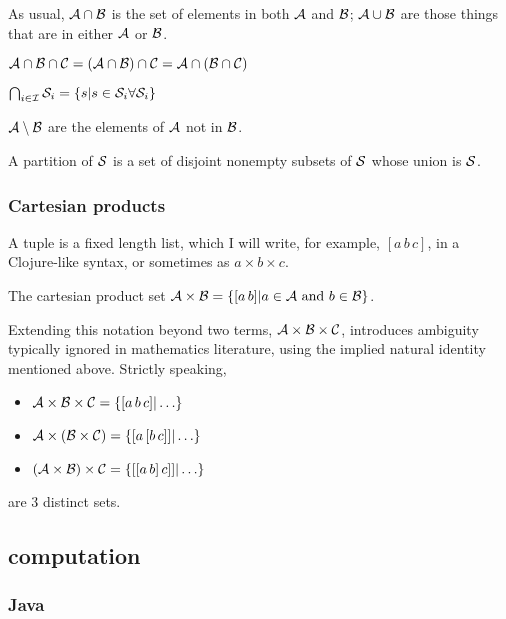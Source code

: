 As usual, $\mathcal{A} \cap \mathcal{B}$ is the set of elements in both 
$\mathcal{A}$ and $\mathcal{B}$; $\mathcal{A} \cup \mathcal{B}$ are those things
that are in either $\mathcal{A}$ or $\mathcal{B}$.

$\mathcal{A} \cap \mathcal{B} \cap \mathcal{C} 
= (\mathcal{A} \cap \mathcal{B}) \cap \mathcal{C} 
= \mathcal{A} \cap (\mathcal{B} \cap \mathcal{C}) $

$\bigcap_{i \in \mathcal{I}} \mathcal{S}_{i} = \{ s | s \in \mathcal{S}_{i}
\forall \mathcal{S}_{i} \}$

$\mathcal{A} \setminus \mathcal{B}$ are the elements of $\mathcal{A}$ 
not in $\mathcal{B}$.

A partition of $\mathcal{S}$ is a set of disjoint nonempty subsets of
$\mathcal{S}$ whose union is $\mathcal{S}$.

\subsubsection{Cartesian products}

A tuple is a fixed length list, which I will write, for example,
$[a \, b \, c]$, in a Clojure-like syntax,
or sometimes as $a \times b \times c$.

The cartesian product set 
$\mathcal{A} \times \mathcal{B} =
\{[a \, b] | a \in \mathcal{A} \text{ and } b \in \mathcal{B}\}$.

Extending this notation beyond two terms,
$\mathcal{A} \times \mathcal{B} \times \mathcal{C}$,
introduces ambiguity typically ignored in mathematics literature,
using the implied natural identity mentioned above.
Strictly speaking,
\begin{itemize}
  \item $\mathcal{A} \times \mathcal{B} \times \mathcal{C} = 
  \{[a \, b \, c] | \ldots \}$
  \item $\mathcal{A} \times (\mathcal{B} \times \mathcal{C}) = 
  \{[a \, [b \,c]] | \ldots \}$
  \item $(\mathcal{A} \times \mathcal{B}) \times \mathcal{C} = 
  \{[[a \, b] \, c]] | \ldots \}$
\end{itemize}
are 3 distinct sets.

\subsection{computation}

\subsubsection{Java}
\lstset{language=Java}


